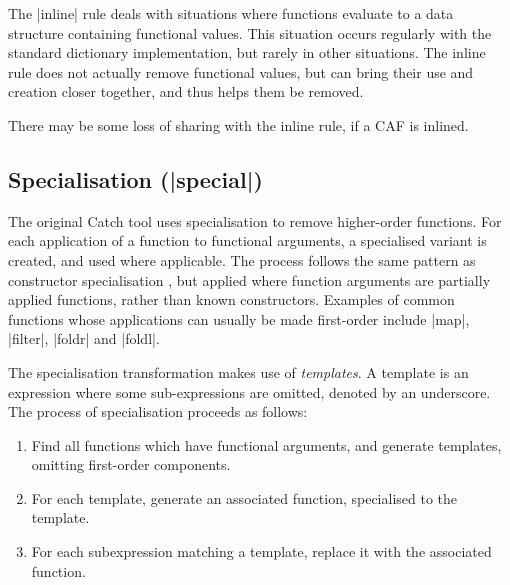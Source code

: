 \documentclass[preprint]{sigplanconf}
\let\cite=\citep
\begin{document}
The |inline| rule deals with situations where functions evaluate to a data structure containing functional values. This situation occurs regularly with the standard dictionary implementation, but rarely in other situations. The inline rule does not actually remove functional values, but can bring their use and creation closer together, and thus helps them be removed.

There may be some loss of sharing with the inline rule, if a CAF is inlined.

\subsection{Specialisation (|special|)}

The original Catch tool \cite{me:catch_tfp} uses specialisation to remove higher-order functions. For each application of a function to functional arguments, a specialised variant is created, and used where applicable. The process follows the same pattern as constructor specialisation \cite{spj:specconstr}, but applied where function arguments are partially applied functions, rather than known constructors. Examples of common functions whose applications can usually be made first-order include |map|, |filter|, |foldr| and |foldl|.

The specialisation transformation makes use of \textit{templates}. A template is an expression where some sub-expressions are omitted, denoted by an underscore. The process of specialisation proceeds as follows:

\begin{enumerate}
\item Find all functions which have functional arguments, and generate templates, omitting first-order components.
\item For each template, generate an associated function, specialised to the template.
\item For each subexpression matching a template, replace it with the associated function.
\end{enumerate}
\end{document}
